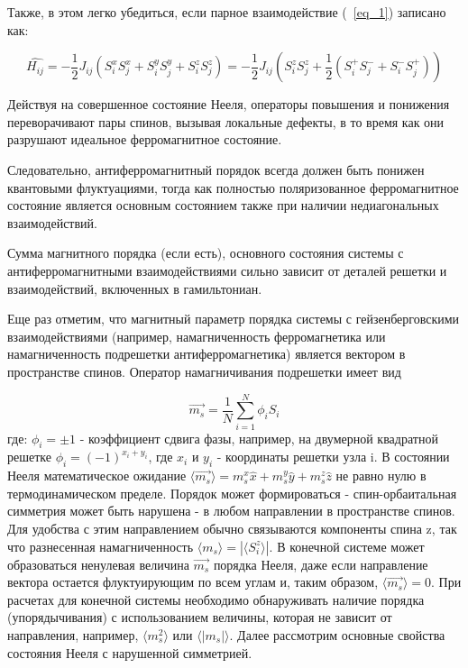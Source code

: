 \documentclass[11pt]{article}
\begin{document}
Также, в этом легко убедиться, если парное взаимодействие (~\ref{eq_1}) записано как:

\begin{equation}
\hat{H_{ij}} = -\frac{1}{2}J_{ij}(S_i^xS_j^x+S_i^yS_j^y+S_i^zS_j^z) = -\frac{1}{2}J_{ij}(S_i^zS_j^z+\frac{1}{2}(S_i^{+}S_j^{-} + S_i^{-}S_j^{+}))
\label{eq_2}
\end{equation}

Действуя на совершенное состояние Нееля, операторы повышения и понижения переворачивают пары спинов, вызывая локальные дефекты, в то время как они разрушают идеальное ферромагнитное состояние. 

Следовательно, антиферромагнитный порядок всегда должен быть понижен квантовыми флуктуациями, тогда как полностью поляризованное ферромагнитное состояние является основным состоянием также при наличии недиагональных взаимодействий. 

Сумма магнитного порядка (если есть), основного состояния системы с антиферромагнитными взаимодействиями сильно зависит от деталей решетки и взаимодействий, включенных в гамильтониан.

Еще раз отметим, что магнитный параметр порядка системы с гейзенберговскими взаимодействиями (например, намагниченность ферромагнетика или намагниченность подрешетки антиферромагнетика) является вектором в пространстве спинов. Оператор намагничивания подрешетки имеет вид

\begin{equation}
\vec{ m_s} = \frac{1}{N}\sum\limits_{i=1}^N \phi_iS_i
\label{eq_3}
\end{equation}
где:
$\phi_i=\pm1$ - коэффициент сдвига фазы, например, на двумерной квадратной решетке $\phi_i=(-1)^{x_i+y_i}$, где $x_i$ и $y_i$ - координаты решетки узла i. В состоянии Нееля математическое ожидание $\langle \vec{m_s} \rangle=m_s^x \hat x + m_s^y \hat y + m_s^z \hat z $ не равно нулю в термодинамическом пределе.
Порядок может формироваться - спин-орбаитальная симметрия может быть нарушена - в любом направлении в пространстве спинов. Для удобства с этим направлением обычно связываются компоненты спина z, так что разнесенная намагниченность $\langle m_s \rangle = | \langle S_i^z \rangle |$. В конечной системе может образоваться ненулевая величина $\vec{m_s}$ порядка Нееля, даже если направление вектора остается флуктуирующим по всем углам и, таким образом, $\langle \vec{m_s} \rangle = 0$. При расчетах для конечной системы необходимо обнаруживать наличие порядка (упорядычивания) с использованием величины, которая не зависит от направления, например, $\langle m_s^2 \rangle$ или $\langle | m_s | \rangle$. Далее рассмотрим основные свойства состояния Нееля с нарушенной симметрией.
\end{document}
